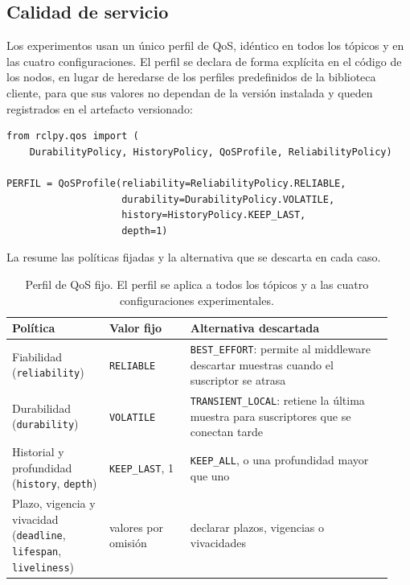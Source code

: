 \subsection{Calidad de servicio}
\label{sec:qos}

Los experimentos usan un único perfil de QoS, idéntico en todos los tópicos y
en las cuatro configuraciones. El perfil se declara de forma explícita en el
código de los nodos, en lugar de heredarse de los perfiles predefinidos de la
biblioteca cliente, para que sus valores no dependan de la versión instalada y
queden registrados en el artefacto versionado:

\begin{verbatim}
from rclpy.qos import (
    DurabilityPolicy, HistoryPolicy, QoSProfile, ReliabilityPolicy)

PERFIL = QoSProfile(reliability=ReliabilityPolicy.RELIABLE,
                    durability=DurabilityPolicy.VOLATILE,
                    history=HistoryPolicy.KEEP_LAST,
                    depth=1)
\end{verbatim}

La  resume las políticas fijadas y la alternativa que
se descarta en cada caso.

\begin{table}[htbp]
  \centering
  \caption[Perfil de QoS]{Perfil de QoS fijo. El perfil se aplica a todos los
  tópicos y a las cuatro configuraciones experimentales.}
  \label{tab:qos-policies}
  \begin{tabular}{@{}L{0.24\linewidth}L{0.20\linewidth}L{0.50\linewidth}@{}}
    \toprule
    \textbf{Política} & \textbf{Valor fijo} & \textbf{Alternativa descartada} \\
    \midrule
    Fiabilidad (\texttt{reliability}) & \texttt{RELIABLE} &
      \texttt{BEST\_EFFORT}: permite al middleware descartar muestras cuando
      el suscriptor se atrasa \\
    Durabilidad (\texttt{durability}) & \texttt{VOLATILE} &
      \texttt{TRANSIENT\_LOCAL}: retiene la última muestra para suscriptores
      que se conectan tarde \\
    Historial y profundidad (\texttt{history}, \texttt{depth}) & \texttt{KEEP\_LAST}, 1 & \texttt{KEEP\_ALL}, o
      una profundidad mayor que uno \\
    Plazo, vigencia y vivacidad (\texttt{deadline}, \texttt{lifespan},
      \texttt{liveliness}) & valores por omisión & declarar plazos,
      vigencias o vivacidades \\
    \bottomrule
  \end{tabular}
\end{table}

